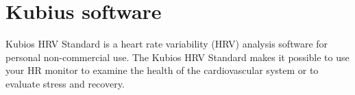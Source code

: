 

\section{Kubius software}

Kubios HRV Standard is a heart rate variability (HRV) analysis software for personal
non-commercial use. The Kubios HRV Standard makes it possible to use your HR monitor to
examine the health of the cardiovascular system or to evaluate stress and recovery.


